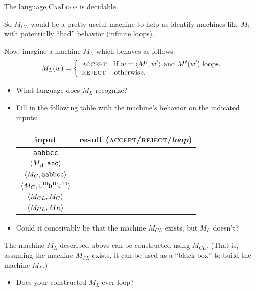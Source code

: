 \documentclass[twoside,letterpaper,openany]{book}
\begin{document}
\begin{stmt}
The language \textsc{CanLoop} is decidable.
\end{stmt}

\begin{discussion}
So $M_{CL}$ would be a pretty useful machine to help us identify machines like $M_C$ with potentially ``bad'' behavior (infinite loops).
\end{discussion}


\begin{exer}\label{tm:canloopone}
Now, imagine a machine $M_{L}$ which behaves as follows:
\[ M_L(w) = \bigg\{
\begin{array}{ll}
\textsc{accept} &  \textrm{if $w = {\langle{M', w'}\rangle}$ and $M'(w')$ loops.} \\
\textsc{reject} & \textrm{otherwise.}
\end{array}
\]

\begin{itemize}
\item What language does $M_L$ recognize?
\item Fill in the following table with the machine's behavior on the indicated inputs:
\begin{center}
\renewcommand{\arraystretch}{1.25}
\begin{tabular}[c]{c|c}
input & result (\textsc{accept}/\textsc{reject}/\textit{loop}) \\\hline
\texttt{aabbcc} & \\
${\langle{M_{A}, \texttt{abc}}\rangle}$ & \\
${\langle{M_{C}, \texttt{aabbcc}}\rangle}$ & \\
${\langle{M_{C}, \texttt{a}^{10}\texttt{b}^{10}\texttt{c}^{10}}\rangle}$ & \\
${\langle{M_{CL}, M_{C}}\rangle}$ & \\
${\langle{M_{CL}, M_{D}}\rangle}$ & \\
\end{tabular}
\end{center}

\item Could it conceivably be that the machine $M_{CL}$ exists, but $M_L$ doesn't? 
\end{itemize}
\end{exer}

\begin{stmt}
The  machine $M_L$ described above can be constructed using $M_{CL}$. (That is, assuming the machine $M_{CL}$ exists, it can be  used as a ``black box'' to build the machine $M_L$.)
\begin{itemize}
\item Does your constructed $M_L$ ever loop?
\end{itemize}

\end{stmt}
\end{document}
